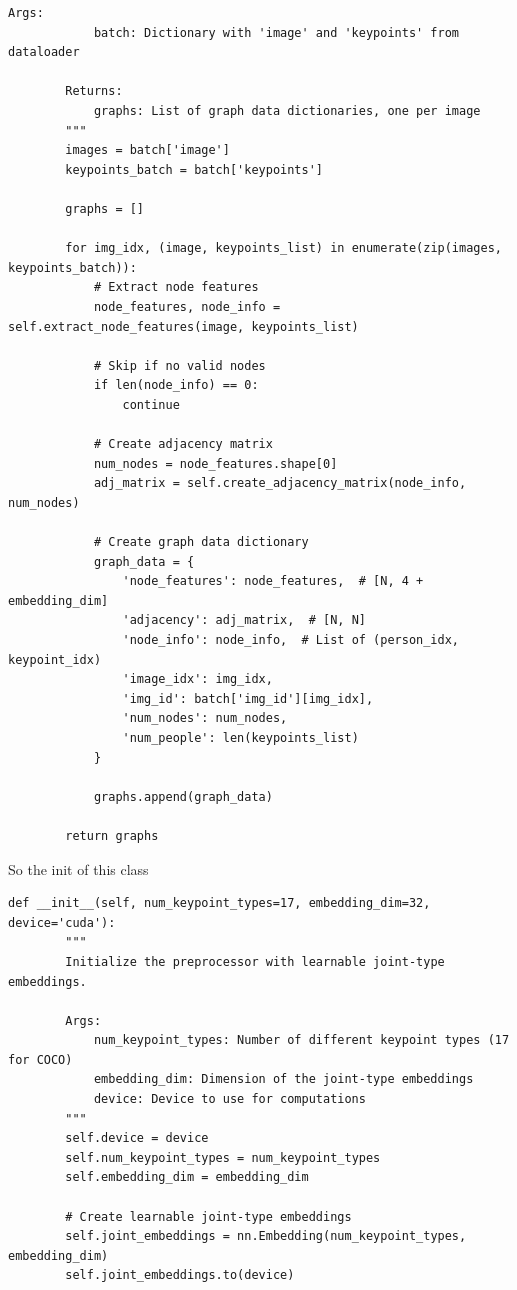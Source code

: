 \begin{lstlisting}[style=pythonstyle,title={Preprocessing May},label={code:preprocessing_may}]
        Args:
            batch: Dictionary with 'image' and 'keypoints' from dataloader
            
        Returns:
            graphs: List of graph data dictionaries, one per image
        """
        images = batch['image']
        keypoints_batch = batch['keypoints']
        
        graphs = []
        
        for img_idx, (image, keypoints_list) in enumerate(zip(images, keypoints_batch)):
            # Extract node features
            node_features, node_info = self.extract_node_features(image, keypoints_list)
            
            # Skip if no valid nodes
            if len(node_info) == 0:
                continue
            
            # Create adjacency matrix
            num_nodes = node_features.shape[0]
            adj_matrix = self.create_adjacency_matrix(node_info, num_nodes)
            
            # Create graph data dictionary
            graph_data = {
                'node_features': node_features,  # [N, 4 + embedding_dim]
                'adjacency': adj_matrix,  # [N, N]
                'node_info': node_info,  # List of (person_idx, keypoint_idx)
                'image_idx': img_idx,
                'img_id': batch['img_id'][img_idx],
                'num_nodes': num_nodes,
                'num_people': len(keypoints_list)
            }
            
            graphs.append(graph_data)
        
        return graphs
\end{lstlisting}

So the init of this class


\begin{lstlisting}[style=pythonstyle,title={Preprocessing May init},label={code:preprocessing_may_init}]
    def __init__(self, num_keypoint_types=17, embedding_dim=32, device='cuda'):
        """
        Initialize the preprocessor with learnable joint-type embeddings.
        
        Args:
            num_keypoint_types: Number of different keypoint types (17 for COCO)
            embedding_dim: Dimension of the joint-type embeddings
            device: Device to use for computations
        """
        self.device = device
        self.num_keypoint_types = num_keypoint_types
        self.embedding_dim = embedding_dim
        
        # Create learnable joint-type embeddings
        self.joint_embeddings = nn.Embedding(num_keypoint_types, embedding_dim)
        self.joint_embeddings.to(device)
\end{lstlisting}

